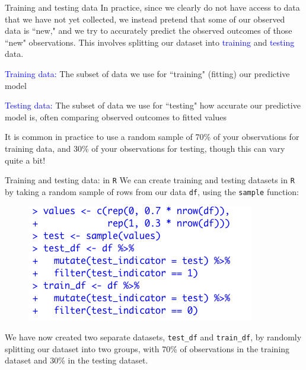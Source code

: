 \documentclass[10pt,t]{beamer}
\begin{document}
\begin{frame}{Training and testing data}
In practice, since we clearly do not have access to data that we have not yet collected, we instead pretend that some of our observed data is ``new," and we try to accurately predict the observed outcomes of those ``new" observations. This involves splitting our dataset into \textcolor{blue}{training} and \textcolor{blue}{testing} data.

\vspace{0.3cm}

\textcolor{blue}{Training data:} The subset of data we use for ``training" (fitting) our predictive model

\vspace{0.3cm}

\textcolor{blue}{Testing data:} The subset of data we use for ``testing" how accurate our predictive model is, often comparing observed outcomes to fitted values

\vspace{0.3cm}

It is common in practice to use a random sample of 70\% of your observations for training data, and 30\% of your observations for testing, though this can vary quite a bit!

\end{frame}

\begin{frame}{Training and testing data: in \texttt{R}}
We can create training and testing datasets in \texttt{R} by taking a random sample of rows from our data \texttt{df}, using the \texttt{sample} function:

\vspace{0.1cm}

\begin{figure}
	\centering \includegraphics[scale=0.5]{figures/traintest.png}
\end{figure}

\vspace{0.1cm}

We have now created two separate datasets, \texttt{test\_df} and \texttt{train\_df}, by randomly splitting our dataset into two groups, with 70\% of observations in the training dataset and 30\% in the testing dataset.

\end{frame}
\end{document}

